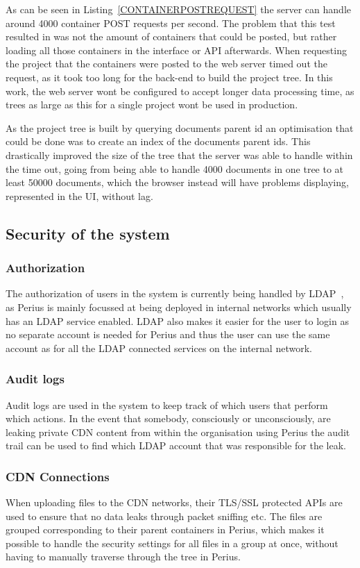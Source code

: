 \documentclass[a4paper,12pt]{article}
\begin{document}
As can be seen in Listing~\ref{CONTAINERPOSTREQUEST} the server can handle around 4000 container
POST requests per second. The problem that this test resulted in was not the amount of containers
that could be posted, but rather loading all those containers in the interface or API afterwards.
When requesting the project that the containers were posted to the web server timed out the request,
as it took too long for the back-end to build the project tree. In this work, the web server wont 
be configured to accept longer data processing time, as trees as large as this for a single project
wont be used in production.

\par
As the project tree is built by querying documents parent id an optimisation that could be done was
to create an index of the documents parent ids. This drastically improved the size of the tree that
the server was able to handle within the time out, going from being able to handle 4000 documents in 
one tree to at least 50000 documents, which the browser instead will have problems displaying, 
represented in the UI, without lag.

\subsection{Security of the system}
\subsubsection{Authorization}
The authorization of users in the system is currently being handled by LDAP~\cite{LDAP}, as Perius 
is mainly focussed at being deployed in internal networks which usually has an LDAP service enabled. 
LDAP also makes it easier for the user to login as no separate account is needed for Perius and 
thus the user can use the same account as for all the LDAP connected services on the internal 
network.

\subsubsection{Audit logs}
Audit logs are used in the system to keep track of which users that perform which actions. In the
event that somebody, consciously or unconsciously, are leaking private CDN content from within the
organisation using Perius the audit trail can be used to find which LDAP account that was
responsible for the leak.

\subsubsection{CDN Connections} \label{sec:cdn_connections}
When uploading files to the CDN networks, their TLS/SSL protected APIs are used to ensure that no
data leaks through packet sniffing etc. The files are grouped corresponding to their parent
containers in Perius, which makes it possible to handle the security settings for all files in a
group at once, without having to manually traverse through the tree in Perius.
\end{document}
